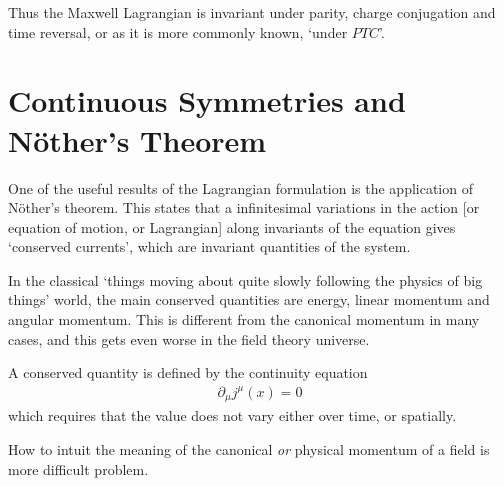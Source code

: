 \documentclass[notes.tex]{subfiles}
\begin{document}
Thus the Maxwell Lagrangian is invariant under parity, charge conjugation and time reversal, or as it is more commonly known, `under $PTC$'.

\section{Continuous Symmetries and N\"other's Theorem}
One of the useful results of the Lagrangian formulation is the application of N\"other's theorem. 
This states that a infinitesimal variations in the action [or equation of motion, or Lagrangian] along invariants of the equation gives `conserved currents', which are invariant quantities of the system.

\begin{whatmeans}
  In the classical `things moving about quite slowly following the physics of big things' world, the main conserved quantities are energy, linear momentum and angular momentum. This is different from the canonical momentum in many cases, and this gets even worse in the field theory universe.

  A conserved quantity is defined by the continuity equation
  \begin{align*}
    \partial_\mu j^\mu(x) = 0
  \end{align*}
  which requires that the value does not vary either over time, or spatially.

  How to intuit the meaning of the canonical \emph{or} physical momentum of a field is more difficult problem.
\end{whatmeans}
\end{document}
